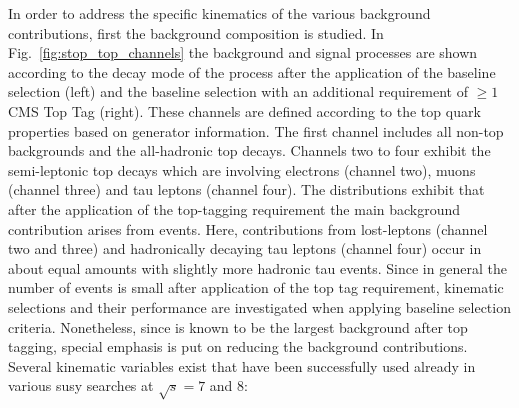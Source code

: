 In order to address the specific kinematics of the various background contributions, first the background composition is studied. In Fig.~\ref{fig:stop_top_channels} the background and signal processes are shown according to the decay mode of the process after the application of the baseline selection (left) and the baseline selection with an additional requirement of $\ge 1$ CMS Top Tag (right). These channels are defined according to the top quark properties based on generator information. The first channel includes all non-top backgrounds and the all-hadronic top decays. Channels two to four exhibit the semi-leptonic top decays which are involving electrons (channel two), muons (channel three) and tau leptons (channel four). The distributions exhibit that after the application of the top-tagging requirement the main background contribution arises from \ttbar events. Here, contributions from lost-leptons (channel two and three) and hadronically decaying tau leptons (channel four) occur in about equal amounts with slightly more hadronic tau events. Since in general the number of events is small after application of the top tag requirement, kinematic selections and their performance are investigated when applying baseline selection criteria. Nonetheless, since \ttbar is known to be the largest background after top tagging, special emphasis is put on reducing the \ttbar background contributions. \\
Several kinematic variables exist that have been successfully used already in various susy searches at $\sqrt{s} = 7$ and 8\tev:
